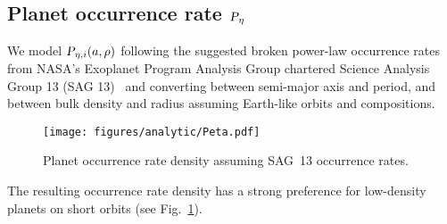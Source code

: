 \subsection{Planet occurrence rate $\textsl{P}_{\eta}$}
We model $\textsl{P}_{\eta, i} (a, \rho)$ following the suggested broken power-law occurrence rates from NASA’s Exoplanet Program Analysis Group chartered Science Analysis Group 13 (SAG 13)~\citep[see][]{Bixel2021} and converting between semi-major axis and period, and between bulk density and radius assuming Earth-like orbits and compositions. 
\begin{figure}[ht!]
    \begin{centering}
        \texttt{[image: figures/analytic/Peta.pdf]}
        \caption{
            Planet occurrence rate density assuming SAG~13 occurrence rates.
        }
        \label{fig:Peta}
    \end{centering}
\end{figure}
The resulting occurrence rate density has a strong preference for low-density planets on short orbits (see Fig.~\ref{fig:Peta}).

